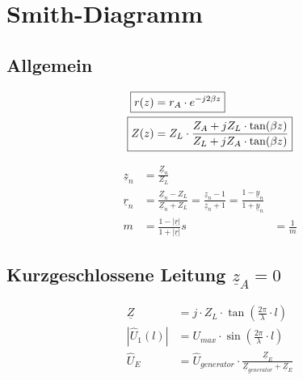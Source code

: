 \section{Smith-Diagramm}

\subsection{Allgemein}
\begin{center}
    \begin{align*}
        \Aboxed{r(z) & = r_A \cdot e^{-j2\beta z}}                                              \\
        \Aboxed{Z(z) & = Z_L\cdot\frac{Z_A+jZ_L\cdot\tan(\beta z)}{Z_L+jZ_A\cdot\tan(\beta z)}}
    \end{align*}
    
\end{center}
\begin{align*}
    \underline{z}_n & = \frac{\underline{Z}_n}{Z_L}                                                                                                                   \\
    \underline{r}_n & = \frac{\underline{Z}_n-Z_L}{\underline{Z}_n+Z_L}= \frac{\underline{z}_n-1}{\underline{z}_n+1}    = \frac{1-\underline{y}_n}{1+\underline{y}_n} \\
    m               & = \frac{1-|\underline{r}|}{1+|\underline{r}|}
    s               & = \frac{1}{m}
\end{align*}
\subsection[Kurzgeschlossene Leitung]{Kurzgeschlossene Leitung  $\underline{z}_A = 0$}
\begin{align*}
    \underline{Z}  & = j\cdot Z_L\cdot\tan\left(\frac{2\pi}{\lambda}\cdot l\right)           \\
    |\hat{U}_1(l)| & = U_{max}\cdot\sin\left(\frac{2\pi}{\lambda}\cdot l\right)              \\
    \hat{U}_E      & = \hat{U}_{generator}\cdot\frac{\underline{Z}_E}{\underline{Z}_{generator}+\underline{Z}_E}
\end{align*}


